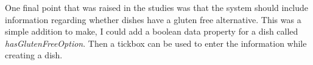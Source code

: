 One final point that was raised in the studies was that the system should include information regarding whether dishes have a gluten free alternative. This was a simple addition to make, I could add a boolean data property for a dish called \textit{hasGlutenFreeOption}. Then a tickbox can be used to enter the information while creating a dish.


